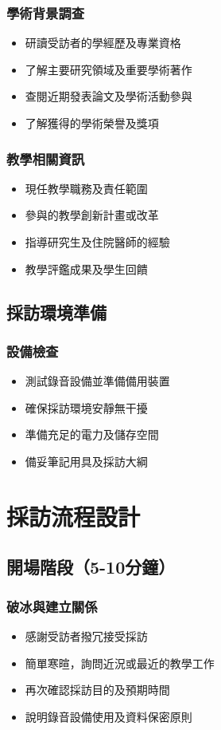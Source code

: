 \documentclass[12pt,a4paper]{article}
\begin{document}
\subsubsection{學術背景調查}
\begin{itemize}[nosep]
    \item 研讀受訪者的學經歷及專業資格
    \item 了解主要研究領域及重要學術著作
    \item 查閱近期發表論文及學術活動參與
    \item 了解獲得的學術榮譽及獎項
\end{itemize}

\subsubsection{教學相關資訊}
\begin{itemize}[nosep]
    \item 現任教學職務及責任範圍
    \item 參與的教學創新計畫或改革
    \item 指導研究生及住院醫師的經驗
    \item 教學評鑑成果及學生回饋
\end{itemize}


\subsection{採訪環境準備}
\subsubsection{設備檢查}
\begin{itemize}[nosep]
    \item 測試錄音設備並準備備用裝置
    \item 確保採訪環境安靜無干擾
    \item 準備充足的電力及儲存空間
    \item 備妥筆記用具及採訪大綱
\end{itemize}

\section{採訪流程設計}

\subsection{開場階段（5-10分鐘）}
\subsubsection{破冰與建立關係}
\begin{itemize}[nosep]
    \item 感謝受訪者撥冗接受採訪
    \item 簡單寒暄，詢問近況或最近的教學工作
    \item 再次確認採訪目的及預期時間
    \item 說明錄音設備使用及資料保密原則
\end{itemize}
\end{document}
